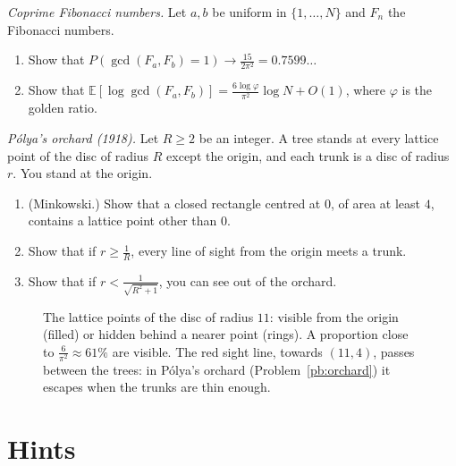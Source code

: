 \begin{exercise}[$\star$]\label{pb:fibcoprime}
\emph{Coprime Fibonacci numbers.} Let $a,b$ be uniform in $\{1,\dots,N\}$ and $F_n$ the Fibonacci numbers.
\begin{enumerate}[label=(\alph*)]
\item Show that $P(\gcd(F_a,F_b)=1)\to\frac{15}{2\pi^2}=0.7599\ldots$
\item Show that $\mathbb E[\log\gcd(F_a,F_b)]=\frac{6\log\varphi}{\pi^2}\log N+O(1)$, where $\varphi$ is the golden ratio.
\end{enumerate}
\end{exercise}

\begin{exercise}[$\star\star$]\label{pb:orchard}
\emph{Pólya's orchard (1918).} Let $R\ge2$ be an integer. A tree stands at every lattice point of the disc of radius $R$ except
the origin, and each trunk is a disc of radius $r$. You stand at the origin.
\begin{enumerate}[label=(\alph*)]
\item (Minkowski.) Show that a closed rectangle centred at $0$, of area at least $4$, contains a lattice point other than $0$.
\item Show that if $r\ge\frac1R$, every line of sight from the origin meets a trunk.
\item Show that if $r<\frac1{\sqrt{R^2+1}}$, you can see out of the orchard.
\end{enumerate}
\end{exercise}

\begin{figure}[ht]
\centering
{}
\caption{The lattice points of the disc of radius $11$: visible from the origin (filled) or hidden behind a nearer point (rings).
A proportion close to $\frac6{\pi^2}\approx61\%$ are visible. The red sight line, towards $(11,4)$,
passes between the trees: in Pólya's orchard (Problem~\ref{pb:orchard}) it escapes when the trunks are thin enough.}
\label{fig:visible}
\end{figure}

\section{Hints}

